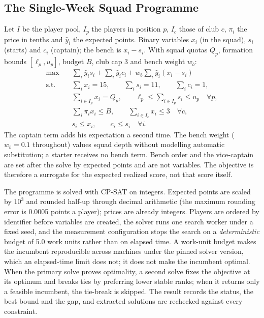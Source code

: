 \documentclass[11pt,a4paper]{article}
\begin{document}
\subsection{The Single-Week Squad Programme}

Let $I$ be the player pool, $I_p$ the players in position $p$, $I_c$ those of club $c$, $\pi_i$ the price in tenths and $\hat y_i$ the expected points. Binary variables $x_i$ (in the squad), $s_i$ (starts) and $c_i$ (captain); the bench is $x_i - s_i$. With squad quotas $Q_p$, formation bounds $[\ell_p, u_p]$, budget $B$, club cap 3 and bench weight $w_b$:
\begin{align}
\max\quad & \sum_i \hat y_i s_i + \sum_i \hat y_i c_i + w_b \sum_i \hat y_i (x_i - s_i) \label{eq:obj}\\
\text{s.t.}\quad & \sum_i x_i = 15,\qquad \sum_i s_i = 11,\qquad \sum_i c_i = 1, \nonumber\\
& \sum_{i \in I_p} x_i = Q_p,\qquad \ell_p \le \sum_{i \in I_p} s_i \le u_p \quad \forall p, \nonumber\\
& \sum_i \pi_i x_i \le B,\qquad \sum_{i\in I_c} x_i \le 3 \quad \forall c, \nonumber\\
& s_i \le x_i,\qquad c_i \le s_i \quad \forall i. \nonumber
\end{align}
The captain term adds his expectation a second time. The bench weight ($w_b = 0.1$ throughout) values squad depth without modelling automatic substitution; a starter receives no bench term. Bench order and the vice-captain are set after the solve by expected points and are not variables. The objective is therefore a surrogate for the expected realized score, not that score itself.

The programme is solved with CP-SAT \cite{ortools} on integers. Expected points are scaled by $10^3$ and rounded half-up through decimal arithmetic (the maximum rounding error is 0.0005 points a player); prices are already integers. Players are ordered by identifier before variables are created, the solver runs one search worker under a fixed seed, and the measurement configuration stops the search on a \emph{deterministic} budget of 5.0 work units rather than on elapsed time. A work-unit budget makes the incumbent reproducible across machines under the pinned solver version, which an elapsed-time limit does not; it does not make the incumbent optimal. When the primary solve proves optimality, a second solve fixes the objective at its optimum and breaks ties by preferring lower stable ranks; when it returns only a feasible incumbent, the tie-break is skipped. The result records the status, the best bound and the gap, and extracted solutions are rechecked against every constraint.
\end{document}
